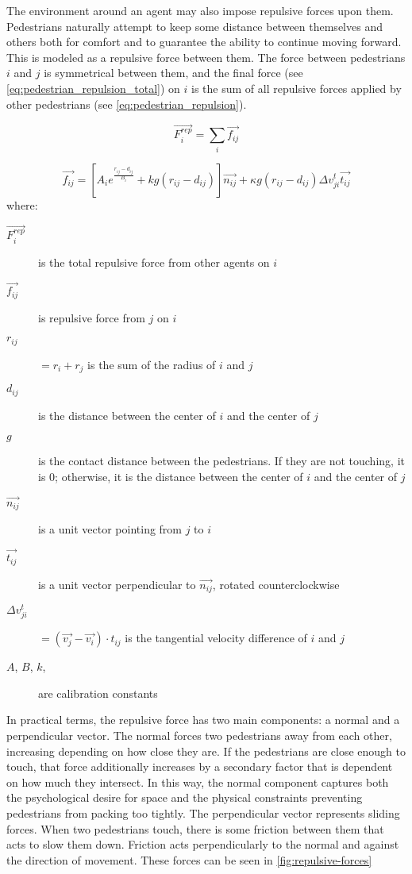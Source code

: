 \documentclass[twoside, 11pt]{article}
\begin{document}
The environment around an agent may also impose repulsive forces upon them. Pedestrians naturally attempt to keep some distance between themselves and others both for comfort and to guarantee the ability to continue moving forward. This is modeled as a repulsive force between them. The force between pedestrians $i$ and $j$ is symmetrical between them, and the final force (see \autoref{eq:pedestrian_repulsion_total}) on $i$ is the sum of all repulsive forces applied by other pedestrians (see \autoref{eq:pedestrian_repulsion}).

\begin{equation}
  \vec{F_i^{rep}} = \sum_i\vec{f_{ij}}
  \label{eq:pedestrian_repulsion_total}
\end{equation}

\begin{equation}
  \vec{f_{ij}} = [A_ie^{\frac{r_{ij} - d_{ij}}{B_i}} + kg(r_{ij}-d_{ij})]\vec{n_{ij}} + \kappa g (r_{ij} - d_{ij})\Delta v_{ji}^t \vec{t_{ij}}
  \label{eq:pedestrian_repulsion}
\end{equation}
where:
\begin{description}
  \item[$\vec{F_i^{rep}}$] is the total repulsive force from other agents on $i$
  \item[$\vec{f_{ij}}$] is repulsive force from $j$ on $i$
  
  \item[$r_{ij}$] $= r_i + r_j$ is the sum of the radius of $i$ and $j$
  \item[$d_{ij}$] is the distance between the center of $i$ and the center of $j$
  \item[$g$] is the contact distance between the pedestrians. If they are not touching, it is $0$; otherwise, it is the distance between the center of $i$ and the center of $j$
  \item[$\vec{n_{ij}}$] is a unit vector pointing from $j$ to $i$
  \item[$\vec{t_{ij}}$] is a unit vector perpendicular to $\vec{n_{ij}}$, rotated counterclockwise
  \item[$\Delta v_{ji}^t$] $= (\vec{v_j} - \vec{v_i}) \cdot t_{ij}$ is the tangential velocity difference of $i$ and $j$
  \item[$A$, $B$, $k$, \kappa] are calibration constants
\end{description}

In practical terms, the repulsive force has two main components: a normal and a perpendicular vector. The normal forces two pedestrians away from each other, increasing depending on how close they are. If the pedestrians are close enough to touch, that force additionally increases by a secondary factor that is dependent on how much they intersect. In this way, the normal component captures both the psychological desire for space and the physical constraints preventing pedestrians from packing too tightly. The perpendicular vector represents sliding forces. When two pedestrians touch, there is some friction between them that acts to slow them down. Friction acts perpendicularly to the normal and against the direction of movement. These forces can be seen in \autoref{fig:repulsive-forces}
\end{document}
